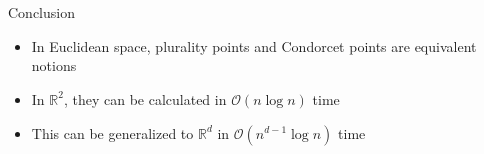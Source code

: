 \documentclass{beamer}
\newcommand{\RR}{\mathbb{R}}
\begin{document}
\section*{}
\begin{frame}{Conclusion}
  \begin{itemize}
  \item In Euclidean space, plurality points and Condorcet points are equivalent notions
  \item In \(\RR^2\), they can be calculated in \(\mathcal{O}(n \log n)\) time
  \item This can be generalized to \(\RR^d\) in \(\mathcal{O}(n^{d-1} \log n)\) time
  \end{itemize}
\end{frame}
\end{document}
